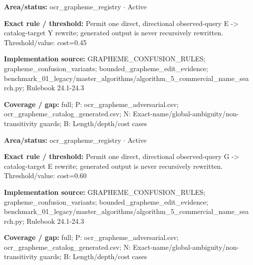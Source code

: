 \begin{tcolorbox}[enhanced,breakable,colback=white,colframe=Muted!45,boxrule=0.45pt,arc=1.5pt,left=6pt,right=6pt,top=5pt,bottom=5pt,title={\texttt{OCR-GRAPHEME-E-TO-Y}},title after break={\texttt{OCR-GRAPHEME-E-TO-Y}\ (continued)},fonttitle=\headingfont\bfseries\color{Navy},coltitle=Navy]
\textbf{Area/status:} ocr\_\allowbreak{}grapheme\_\allowbreak{}registry $\boldsymbol{\cdot}$ Active\par
\smallskip
\textbf{Exact rule / threshold:} Permit one direct, directional observed-query E -> catalog-target Y rewrite; generated output is never recursively rewritten. Threshold/\allowbreak{}value: cost=0.45\par
\smallskip
\textbf{Implementation source:} GRAPHEME\_\allowbreak{}CONFUSION\_\allowbreak{}RULES; grapheme\_\allowbreak{}confusion\_\allowbreak{}variants; bounded\_\allowbreak{}grapheme\_\allowbreak{}edit\_\allowbreak{}evidence; benchmark\_\allowbreak{}01\_\allowbreak{}legacy/\allowbreak{}master\_\allowbreak{}algorithms/\allowbreak{}algorithm\_\allowbreak{}5\_\allowbreak{}commercial\_\allowbreak{}name\_\allowbreak{}search.py; Rulebook 24.1-24.3\par
\smallskip
\textbf{Coverage / gap:} full; P: ocr\_\allowbreak{}grapheme\_\allowbreak{}adversarial.csv; ocr\_\allowbreak{}grapheme\_\allowbreak{}catalog\_\allowbreak{}generated.csv; N: Exact-name/\allowbreak{}global-ambiguity/\allowbreak{}non-transitivity guards; B: Length/\allowbreak{}depth/\allowbreak{}cost cases
\end{tcolorbox}
\begin{tcolorbox}[enhanced,breakable,colback=white,colframe=Muted!45,boxrule=0.45pt,arc=1.5pt,left=6pt,right=6pt,top=5pt,bottom=5pt,title={\texttt{OCR-GRAPHEME-G-TO-E}},title after break={\texttt{OCR-GRAPHEME-G-TO-E}\ (continued)},fonttitle=\headingfont\bfseries\color{Navy},coltitle=Navy]
\textbf{Area/status:} ocr\_\allowbreak{}grapheme\_\allowbreak{}registry $\boldsymbol{\cdot}$ Active\par
\smallskip
\textbf{Exact rule / threshold:} Permit one direct, directional observed-query G -> catalog-target E rewrite; generated output is never recursively rewritten. Threshold/\allowbreak{}value: cost=0.60\par
\smallskip
\textbf{Implementation source:} GRAPHEME\_\allowbreak{}CONFUSION\_\allowbreak{}RULES; grapheme\_\allowbreak{}confusion\_\allowbreak{}variants; bounded\_\allowbreak{}grapheme\_\allowbreak{}edit\_\allowbreak{}evidence; benchmark\_\allowbreak{}01\_\allowbreak{}legacy/\allowbreak{}master\_\allowbreak{}algorithms/\allowbreak{}algorithm\_\allowbreak{}5\_\allowbreak{}commercial\_\allowbreak{}name\_\allowbreak{}search.py; Rulebook 24.1-24.3\par
\smallskip
\textbf{Coverage / gap:} full; P: ocr\_\allowbreak{}grapheme\_\allowbreak{}adversarial.csv; ocr\_\allowbreak{}grapheme\_\allowbreak{}catalog\_\allowbreak{}generated.csv; N: Exact-name/\allowbreak{}global-ambiguity/\allowbreak{}non-transitivity guards; B: Length/\allowbreak{}depth/\allowbreak{}cost cases
\end{tcolorbox}
